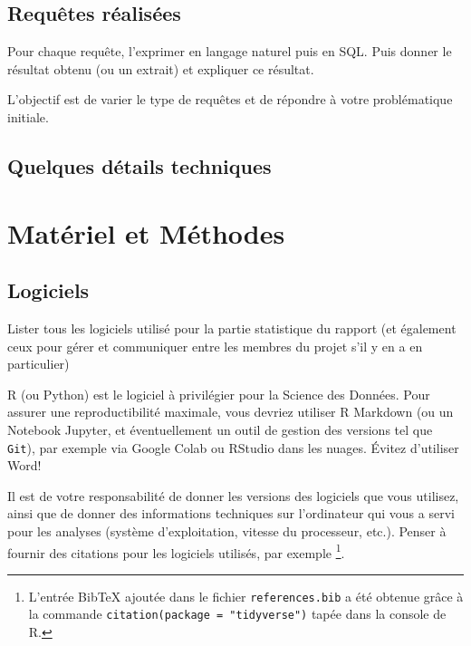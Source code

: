 \documentclass[mstat,12pt]{unswthesis}
\begin{document}
\normalsize

\newpage

\section{Requêtes réalisées}\label{requuxeates-ruxe9alisuxe9es}

Pour chaque requête, l'exprimer en langage naturel puis en SQL. Puis
donner le résultat obtenu (ou un extrait) et expliquer ce résultat.

L'objectif est de varier le type de requêtes et de répondre à votre
problématique initiale.

\section{Quelques détails
techniques}\label{quelques-duxe9tails-techniques}

\chapter{Matériel et Méthodes}\label{matuxe9riel-et-muxe9thodes}

\section{Logiciels}\label{logiciels}

Lister tous les logiciels utilisé pour la partie statistique du rapport
(et également ceux pour gérer et communiquer entre les membres du projet
s'il y en a en particulier)

\medskip

R (ou Python) est le logiciel à privilégier pour la Science des Données.
Pour assurer une reproductibilité maximale, vous devriez utiliser R
Markdown (ou un Notebook Jupyter, et éventuellement un outil de gestion
des versions tel que \texttt{Git}), par exemple via Google Colab ou
RStudio dans les nuages. Évitez d'utiliser Word!

\bigskip

Il est de votre responsabilité de donner les versions des logiciels que
vous utilisez, ainsi que de donner des informations techniques sur
l'ordinateur qui vous a servi pour les analyses (système d'exploitation,
vitesse du processeur, etc.). Penser à fournir des citations pour les
logiciels utilisés, par exemple
\footnote{L'entrée BibTeX ajoutée dans le fichier \texttt{references.bib} a été obtenue grâce à la commande  \texttt{citation(package = "tidyverse")} tapée dans la console de R.}.
\end{document}
